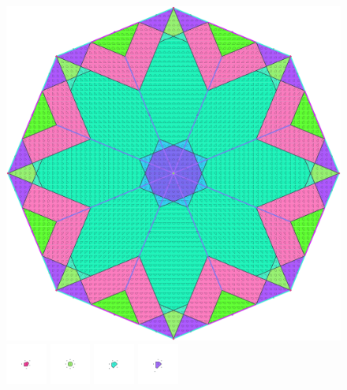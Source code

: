 \documentclass[text.tex]{subfiles}
\begin{document}
\clearpage
\pagestyle{fancy}
\fancyhf{}
\begin{figure}[h!]
\centering
\includegraphics[width=1\textwidth]{img/results/octagon/octagon_241421_(0_1alpha_1).pdf}
\includegraphics[width=0.12\textwidth]{img/results/octagon/octagon_241421_(0_1alpha_1)_001.pdf}
\includegraphics[width=0.12\textwidth]{img/results/octagon/octagon_241421_(0_1alpha_1)_002.pdf}
\includegraphics[width=0.12\textwidth]{img/results/octagon/octagon_241421_(0_1alpha_1)_003.pdf}
\includegraphics[width=0.12\textwidth]{img/results/octagon/octagon_241421_(0_1alpha_1)_004.pdf}

\end{figure}
\end{document}
